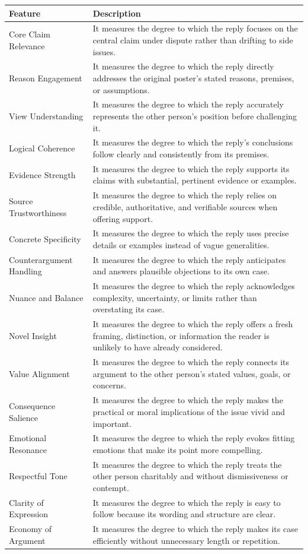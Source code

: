 \begin{tabularx}{\textwidth}{@{}>{\raggedright\arraybackslash}p{} X@{}}
\toprule
Feature & Description \\
\midrule
Core Claim Relevance & It measures the degree to which the reply focuses on the central claim under dispute rather than drifting to side issues. \\
Reason Engagement & It measures the degree to which the reply directly addresses the original poster's stated reasons, premises, or assumptions. \\
View Understanding & It measures the degree to which the reply accurately represents the other person's position before challenging it. \\
Logical Coherence & It measures the degree to which the reply's conclusions follow clearly and consistently from its premises. \\
Evidence Strength & It measures the degree to which the reply supports its claims with substantial, pertinent evidence or examples. \\
Source Trustworthiness & It measures the degree to which the reply relies on credible, authoritative, and verifiable sources when offering support. \\
Concrete Specificity & It measures the degree to which the reply uses precise details or examples instead of vague generalities. \\
Counterargument Handling & It measures the degree to which the reply anticipates and answers plausible objections to its own case. \\
Nuance and Balance & It measures the degree to which the reply acknowledges complexity, uncertainty, or limits rather than overstating its case. \\
Novel Insight & It measures the degree to which the reply offers a fresh framing, distinction, or information the reader is unlikely to have already considered. \\
Value Alignment & It measures the degree to which the reply connects its argument to the other person's stated values, goals, or concerns. \\
Consequence Salience & It measures the degree to which the reply makes the practical or moral implications of the issue vivid and important. \\
Emotional Resonance & It measures the degree to which the reply evokes fitting emotions that make its point more compelling. \\
Respectful Tone & It measures the degree to which the reply treats the other person charitably and without dismissiveness or contempt. \\
Clarity of Expression & It measures the degree to which the reply is easy to follow because its wording and structure are clear. \\
Economy of Argument & It measures the degree to which the reply makes its case efficiently without unnecessary length or repetition. \\
\bottomrule
\end{tabularx}
